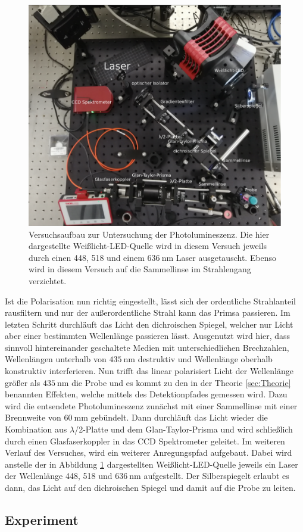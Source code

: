 \begin{figure}[hbtp]
	\centering
	\includegraphics[width=\textwidth]{Abb/aufbau.png}
	\caption{Versuchsaufbau \cite{flex} zur Untersuchung der Photolumineszenz. Die
    hier dargestellte Weißlicht-LED-Quelle wird in diesem Versuch jeweils durch einen
    448, 518 und einem $\SI{636}{\nano\meter}$ Laser ausgetauscht. Ebenso wird in diesem
    Versuch auf die Sammellinse im Strahlengang verzichtet.}
	\label{fig:aufbau}
\end{figure}
\noindent
Ist die Polarisation
nun richtig eingestellt, lässt sich der ordentliche Strahlanteil rausfiltern und
nur der außerordentliche Strahl kann das Primsa passieren. Im letzten Schritt
durchläuft das Licht den dichroischen Spiegel, welcher nur Licht aber einer bestimmten
Wellenlänge passieren lässt. Ausgenutzt wird hier, dass sinnvoll hintereinander
geschaltete Medien mit unterschiedlichen Brechzahlen, Wellenlängen unterhalb von
$\SI{435}{\nano\meter}$ destruktiv und Wellenlänge oberhalb konstruktiv interferieren.
Nun trifft das linear polarisiert Licht der Wellenlänge größer als $\SI{435}{\nano\meter}$
die Probe und es kommt zu den in der Theorie \ref{sec:Theorie} benannten Effekten,
welche mittels des Detektionpfades gemessen wird. Dazu wird die entsendete
Photolumineszenz zunächst mit einer Sammellinse mit einer Brennweite von
$\SI{60}{\milli\meter}$ gebündelt. Dann durchläuft das Licht wieder die Kombination
aus $\lambda$/2-Platte und dem Glan-Taylor-Prisma und wird schließlich durch einen
Glasfaserkoppler in das CCD Spektrometer geleitet.
Im weiteren Verlauf des Versuches, wird ein weiterer Anregungspfad aufgebaut. Dabei
wird anstelle der in Abbildung \ref{fig:aufbau} dargestellten Weißlicht-LED-Quelle
jeweils ein Laser der Wellenlänge 448, 518 und $\SI{636}{\nano\meter}$
aufgestellt. Der Silberspiegelt erlaubt es dann, das Licht auf den dichroischen Spiegel
und damit auf die Probe zu leiten.\\

\subsection{Experiment}
\label{sec:Experiment}
